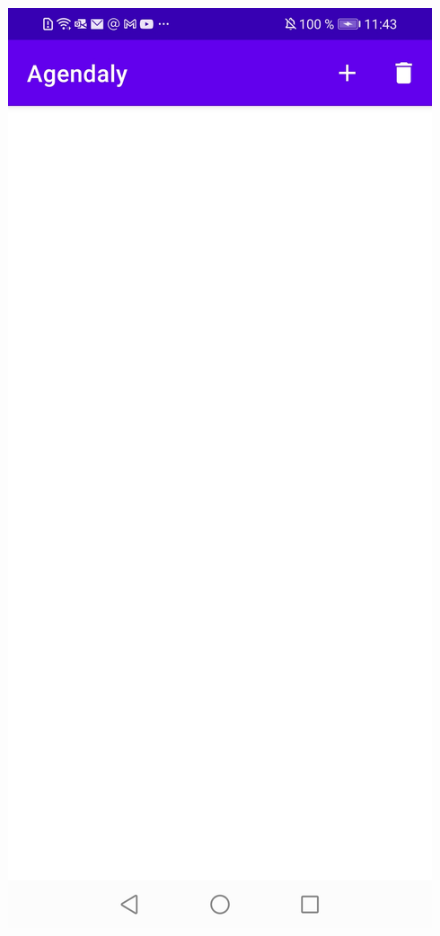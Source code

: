 \documentclass[a4paper,openright,12pt]{article}
\begin{document}
\begin{figure}
            \includegraphics[scale=0.05]{calendar2.jpg}\hfill

\end{figure}
\end{document}
